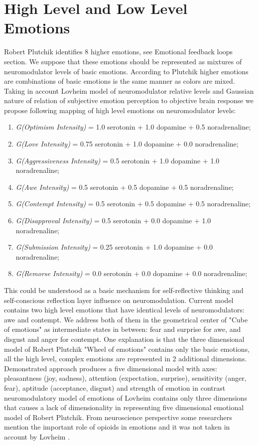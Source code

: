 \section{High Level and Low Level Emotions}

Robert Plutchik \cite{natureofemotions} identifies 8 higher emotions, see Emotional feedback loops section. We suppose that these emotions should be represented as mixtures of neuromodulator levels of basic emotions. According to Plutchik higher emotions are combinations of basic emotions is the same manner as colors are mixed. Taking in account Lovheim model of neuromodulator relative levels and Gaussian nature of relation of subjective emotion perception to objective brain response \cite{senticcomputing, neuralcorrelatesofhate} we propose following mapping of high level emotions on neuromodulator levels:

\begin{enumerate}
 \item  \emph{G(Optimism Intensity)} = 1.0 serotonin  + 1.0 dopamine + 0.5 noradrenaline;
 \item  \emph{G(Love Intensity)} = 0.75 serotonin + 1.0 dopamine + 0.0 noradrenaline;
 \item  \emph{G(Aggressiveness Intensity)} = 0.5 serotonin + 1.0 dopamine + 1.0 noradrenaline;
 \item  \emph{G(Awe Intensity)} = 0.5 serotonin + 0.5 dopamine + 0.5 noradrenaline;
 \item  \emph{G(Contempt Intensity)} = 0.5 serotonin + 0.5 dopamine + 0.5 noradrenaline;
 \item  \emph{G(Disapproval Intensity)} = 0.5 serotonin + 0.0 dopamine + 1.0 noradrenaline;
 \item  \emph{G(Submission Intensity)} = 0.25 serotonin + 1.0 dopamine + 0.0 noradrenaline;
 \item  \emph{G(Remorse Intensity)} = 0.0 serotonin + 0.0 dopamine + 0.0 noradrenaline;
\end{enumerate}

This could be understood as a basic mechanism for self-reflective thinking and self-conscious reflection layer influence on neuromodulation. Current model contains two high level emotions that have identical levels of neuromodulators: awe and contempt. We address both of them in the geometrical center of "Cube of emotions" \cite{cubeofemotions} as intermediate states in between: fear and surprise for awe, and disgust and anger for contempt. One explanation is that the three dimensional model of Robert Plutchik "Wheel of emotions" contains only the basic emotions, all the high level, complex emotions are represented in 2 additional dimensions. Demonstrated approach produces a five dimensional model with axes: pleasantness (joy, sadness), attention (expectation, surprise), sensitivity (anger, fear), aptitude (acceptance, disgust) and strength of emotion \cite{senticcomputing} in contrast neuromodulatory model of emotions of Lovheim contains only three dimensions that causes a lack of dimensionality in representing five dimensional emotional model of Robert Plutchik. From neuroscience perspective some researchers mention the important role of opioids in emotions and it was not taken in account by Lovheim \cite{emotionsbraintorobot}.

